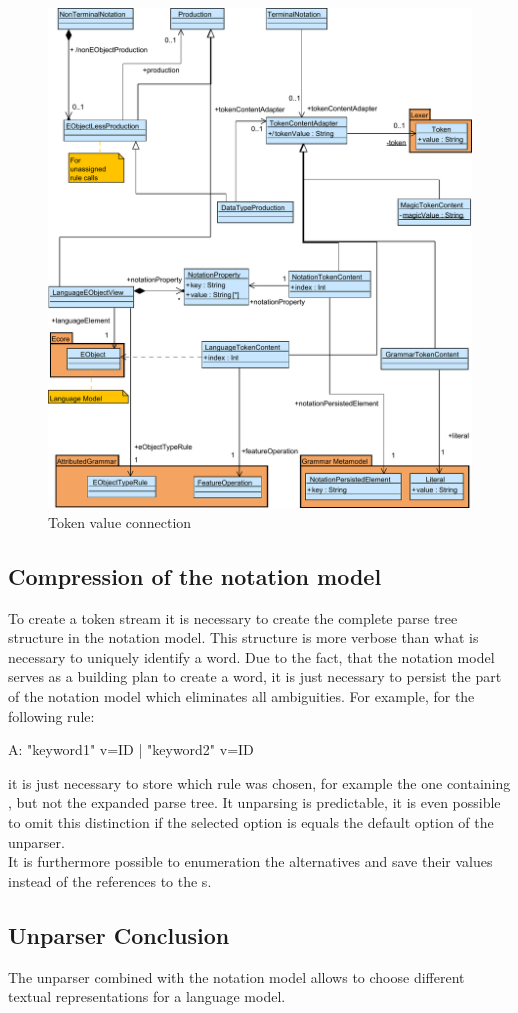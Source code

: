 \begin{figure}
\centering
\includegraphics[scale=0.7]{gfx/ex/Notation_DataLink} 
\caption{Token value connection}
\label{MM:Not:DataLink}
\end{figure}

\subsection{Compression of the notation model}
To create a token stream it is necessary to create the complete parse tree structure in the notation model. This structure is more verbose than what is necessary to uniquely identify a word. Due to the fact, that the notation model serves as a building plan to create a word, it is just necessary to persist the part of the notation model which eliminates all ambiguities. For example, for the following rule:
\begin{xtxt}
A:  "keyword1" v=ID 
 |  "keyword2" v=ID
\end{xtxt}
it is just necessary to store which rule was chosen, for example the one containing , but not the expanded parse tree. It unparsing is predictable, it is even possible to omit this distinction if the selected option is equals the default option of the unparser.  \\
It is furthermore possible to enumeration the alternatives and save their values instead of the references to the s.

\subsection{Unparser Conclusion}
The unparser combined with the notation model allows to choose different textual representations for a language model. 




